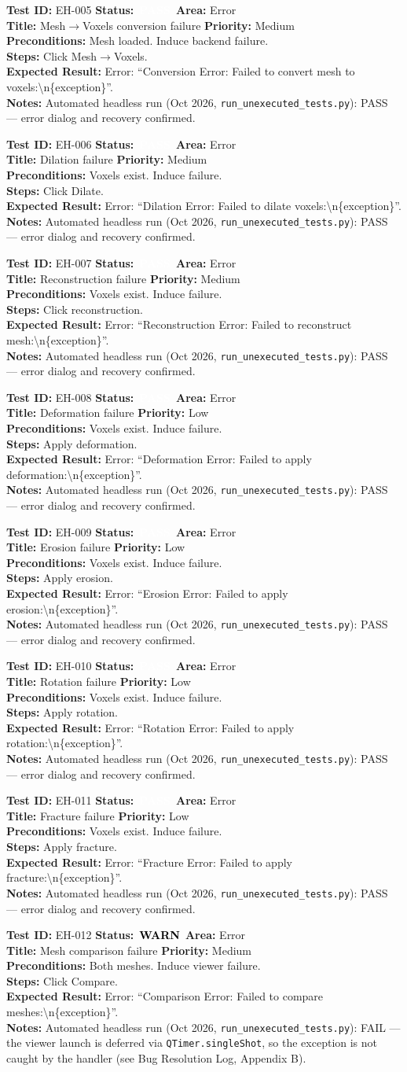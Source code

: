 \documentclass[12pt,a4paper]{article}
\newcommand{\statuspass}{\colorbox{statusgreen}{\textcolor{white}{\textbf{\,PASS\,}}}}
\newcommand{\statuswarn}{\colorbox{statusyellow}{\textcolor{black}{\textbf{\,WARN\,}}}}
\newcommand{\testcase}[9]{%
  \smallskip
  \noindent\textbf{Test ID:} #1 \hfill \textbf{Status:} #2 \hfill \textbf{Area:} #3 \\
  \textbf{Title:} #4 \hfill \textbf{Priority:} #5 \\[0.3em]
  \textbf{Preconditions:} #6 \\[0.3em]
  \textbf{Steps:} #7 \\[0.3em]
  \textbf{Expected Result:} #8 \\
  \textbf{Notes:} #9
  \smallskip
}
\begin{document}
\testcase{EH-005}{\statuspass}{Error}{Mesh$\rightarrow$Voxels conversion failure}{Medium}{Mesh loaded. Induce backend failure.}{Click Mesh$\rightarrow$Voxels.}{Error: ``Conversion Error: Failed to convert mesh to voxels:\textbackslash n\{exception\}''.}{Automated headless run (Oct 2026, \texttt{run\_unexecuted\_tests.py}): PASS --- error dialog and recovery confirmed.}


\testcase{EH-006}{\statuspass}{Error}{Dilation failure}{Medium}{Voxels exist. Induce failure.}{Click Dilate.}{Error: ``Dilation Error: Failed to dilate voxels:\textbackslash n\{exception\}''.}{Automated headless run (Oct 2026, \texttt{run\_unexecuted\_tests.py}): PASS --- error dialog and recovery confirmed.}


\testcase{EH-007}{\statuspass}{Error}{Reconstruction failure}{Medium}{Voxels exist. Induce failure.}{Click reconstruction.}{Error: ``Reconstruction Error: Failed to reconstruct mesh:\textbackslash n\{exception\}''.}{Automated headless run (Oct 2026, \texttt{run\_unexecuted\_tests.py}): PASS --- error dialog and recovery confirmed.}


\testcase{EH-008}{\statuspass}{Error}{Deformation failure}{Low}{Voxels exist. Induce failure.}{Apply deformation.}{Error: ``Deformation Error: Failed to apply deformation:\textbackslash n\{exception\}''.}{Automated headless run (Oct 2026, \texttt{run\_unexecuted\_tests.py}): PASS --- error dialog and recovery confirmed.}


\testcase{EH-009}{\statuspass}{Error}{Erosion failure}{Low}{Voxels exist. Induce failure.}{Apply erosion.}{Error: ``Erosion Error: Failed to apply erosion:\textbackslash n\{exception\}''.}{Automated headless run (Oct 2026, \texttt{run\_unexecuted\_tests.py}): PASS --- error dialog and recovery confirmed.}


\testcase{EH-010}{\statuspass}{Error}{Rotation failure}{Low}{Voxels exist. Induce failure.}{Apply rotation.}{Error: ``Rotation Error: Failed to apply rotation:\textbackslash n\{exception\}''.}{Automated headless run (Oct 2026, \texttt{run\_unexecuted\_tests.py}): PASS --- error dialog and recovery confirmed.}


\testcase{EH-011}{\statuspass}{Error}{Fracture failure}{Low}{Voxels exist. Induce failure.}{Apply fracture.}{Error: ``Fracture Error: Failed to apply fracture:\textbackslash n\{exception\}''.}{Automated headless run (Oct 2026, \texttt{run\_unexecuted\_tests.py}): PASS --- error dialog and recovery confirmed.}


\testcase{EH-012}{\statuswarn}{Error}{Mesh comparison failure}{Medium}{Both meshes. Induce viewer failure.}{Click Compare.}{Error: ``Comparison Error: Failed to compare meshes:\textbackslash n\{exception\}''.}{Automated headless run (Oct 2026, \texttt{run\_unexecuted\_tests.py}): FAIL --- the viewer launch is deferred via \texttt{QTimer.singleShot}, so the exception is not caught by the handler (see Bug Resolution Log, Appendix B).}
\end{document}

